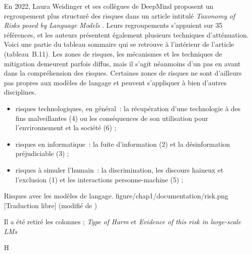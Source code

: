 {En 2022, Laura Weidinger et ses collègues de DeepMind proposent un regroupement plus structuré des risques dans un article intitulé \textit{Taxonomy of Risks posed by Language Models} \cite{weidinger_taxonomy_2022}. Leurs regroupements s'appuient sur 35 références, et les auteurs présentent également plusieurs techniques d'atténuation. Voici une partie du tableau sommaire qui se retrouve à l'intérieur de l'article (tableau~B.11). 
Les zones de risques, les mécanismes et les techniques de mitigation demeurent parfois diffus, mais il s'agit néanmoins d'un pas en avant dans la compréhension des risques. Certaines zones de risques ne sont d'ailleurs pas propres aux modèles de langage et peuvent s'appliquer à bien d'autres disciplines.
\begin{itemize}
    \item risques technologiques, en général~: la récupération d'une technologie à des fins malveillantes (4) ou les conséquences de son utilisation pour l'environnement et la société (6) ;
    \item risques en informatique~: la fuite d'information (2) et la désinformation préjudiciable (3) ;
    \item risques à simuler l'humain~: la discrimination, les discours haineux et l'exclusion (1) et les interactions personne-machine (5) ;
\end{itemize}
\tab
{Risques avec les modèles de langage.}
{figure/chap1/documentation/risk.png}
{[Traduction libre] (modifié de \cite{weidinger_taxonomy_2022})}
{}{
\begin{tablenotes}
\footnotesize
\item[a] {Il a été retiré les colonnes ; \textit{Type of Harm} et \textit{Evidence of this risk in large-scale LMs}}
\end{tablenotes}
}{H}
\vspace{-1\baselineskip}
}{}

